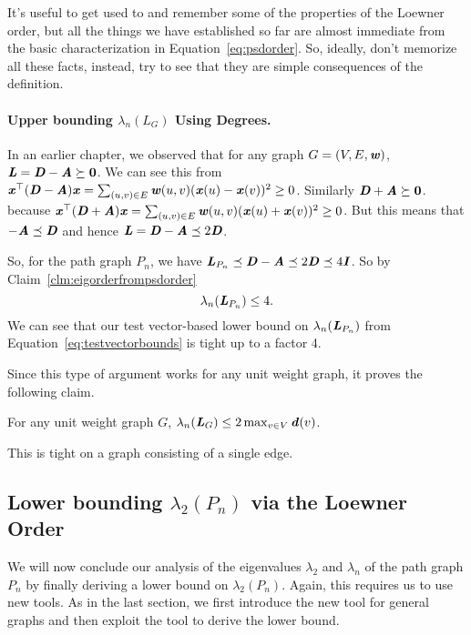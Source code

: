 \begin{remark}
  It's useful to get used to and remember some of the properties of the Loewner
  order, but all the things we have established so far are almost
  immediate from the basic characterization in
  Equation~\eqref{eq:psdorder}.
  So, ideally, don't memorize all these facts, instead, try to see that
  they are simple consequences of the definition.
\end{remark}

\paragraph{Upper bounding $\lambda_n(L_G)$ Using Degrees.} In an earlier chapter, we observed that for any graph $G=(V,E,\boldsymbol{\mathit{w}})$,
$\boldsymbol{\mathit{L}} = \boldsymbol{\mathit{D}} - \boldsymbol{\mathit{A}} \succeq \boldsymbol{0}$.
We can see this from
$\boldsymbol{\mathit{x}}^\top (\boldsymbol{\mathit{D}}-\boldsymbol{\mathit{A}}) \boldsymbol{\mathit{x}} = \sum_{ (u,v) \in E } \boldsymbol{\mathit{w}}(u,v)
( \boldsymbol{\mathit{x}}(u) - \boldsymbol{\mathit{x}}(v) )^2 \geq 0$.
Similarly $\boldsymbol{\mathit{D}} + \boldsymbol{\mathit{A}} \succeq \boldsymbol{0}$. because
$\boldsymbol{\mathit{x}}^\top (\boldsymbol{\mathit{D}}+\boldsymbol{\mathit{A}}) \boldsymbol{\mathit{x}} = \sum_{ (u,v) \in E } \boldsymbol{\mathit{w}}(u,v)
( \boldsymbol{\mathit{x}}(u) + \boldsymbol{\mathit{x}}(v) )^2 \geq 0$.
But this means that $-\boldsymbol{\mathit{A}} \preceq \boldsymbol{\mathit{D}}$ and hence $\boldsymbol{\mathit{L}} = \boldsymbol{\mathit{D}}-\boldsymbol{\mathit{A}}
\preceq 2\boldsymbol{\mathit{D}}$.

So, for the path graph $P_n$, we have
$\boldsymbol{\mathit{L}}_{P_n} \preceq \boldsymbol{\mathit{D}}-\boldsymbol{\mathit{A}} \preceq 2\boldsymbol{\mathit{D}} \preceq 4 \boldsymbol{\mathit{I}}$.
So by Claim~\ref{clm:eigorderfrompsdorder}
\begin{equation}
  \label{eq:pathlambdamaxub}
\lambda_n(\boldsymbol{\mathit{L}}_{P_n}) \leq 4.
\end{equation}
We can see that our test vector-based lower bound on $\lambda_n(\boldsymbol{\mathit{L}}_{P_n})$ from
Equation~\eqref{eq:testvectorbounds} is tight up
to a factor 4.

Since this type of argument works for any unit weight graph, it proves the following claim.
\begin{claim}
  \label{clm:lambdamaxfromeig}
  For any unit weight graph $G$,
  $\lambda_{n}(\boldsymbol{\mathit{L}}_G) \leq 2 \max_{v
    \in V} \boldsymbol{\mathit{d}}(v)$.
\end{claim}
This is tight on a graph consisting of a single edge.

\subsection{Lower bounding $\lambda_2(P_n)$ via the Loewner Order}

We will now conclude our analysis of the eigenvalues $\lambda_2$ and $\lambda_n$ of the path graph $P_n$ by finally deriving a lower bound on $\lambda_2(P_n)$. Again, this requires us to use new tools. As in the last section, we first introduce the new tool for general graphs and then exploit the tool to derive the lower bound.

